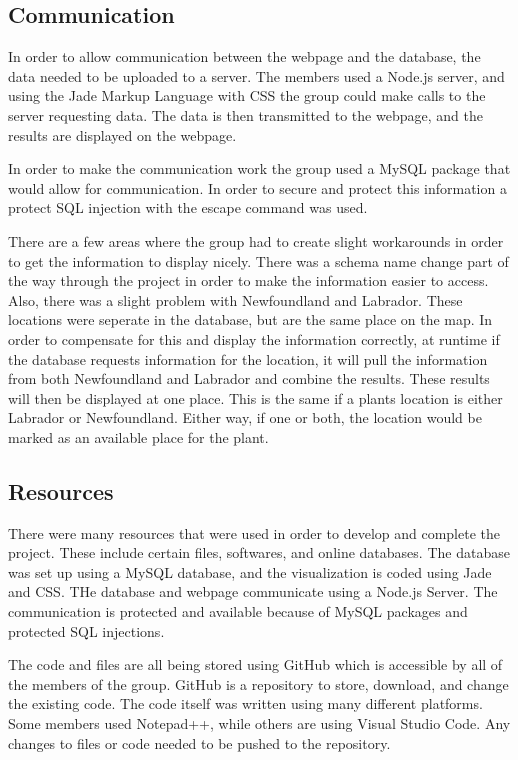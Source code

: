 \documentclass{Group6_Phase2}
\begin{document}
\subsection{Communication}
In order to allow communication between the webpage and the database, the data needed to be uploaded to a server. The members used a Node.js server, and using the Jade Markup Language with CSS the group could make calls to the server requesting data. The data is then transmitted to the webpage, and the results are displayed on the webpage. 

In order to make the communication work the group used a MySQL package that would allow for communication. In order to secure and protect this information a protect SQL injection with the escape command was used.

There are a few areas where the group had to create slight workarounds in order to get the information to display nicely. There was a schema name change part of the way through the project in order to make the information easier to access. Also, there was a slight problem with Newfoundland and Labrador. These locations were seperate in the database, but are the same place on the map. In order to compensate for this and display the information correctly, at runtime if the database requests information for the location, it will pull the information from both Newfoundland and Labrador and combine the results. These results will then be displayed at one place. This is the same if a plants location is either Labrador or Newfoundland. Either way, if one or both, the location would be marked as an available place for the plant. 

\subsection{Resources}
There were many resources that were used in order to develop and complete the project. These include certain files, softwares, and online databases. 
The database was set up using a MySQL database, and the visualization is coded using Jade and CSS. THe database and webpage communicate using a Node.js Server. The communication is protected and available because of MySQL packages and protected SQL injections.

The code and files are all being stored using GitHub which is accessible by all of the members of the group. GitHub is a repository to store, download, and change the existing code. The code itself was written using many different platforms. Some members used Notepad++, while others are using Visual Studio Code. Any changes to files or code needed to be pushed to the repository.
\end{document}
